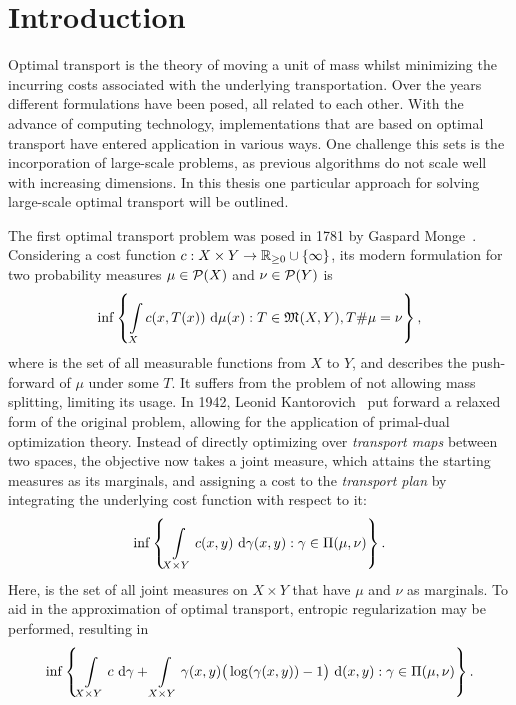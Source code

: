 \chapter*{Introduction}

Optimal transport is the theory of moving a unit of mass whilst minimizing the incurring costs associated with the underlying transportation. Over the years different formulations have been posed, all related to each other. With the advance of computing technology, implementations that are based on optimal transport have entered application in various ways. One challenge this sets is the incorporation of large-scale problems, as previous algorithms do not scale well with increasing dimensions. In this thesis one particular approach for solving large-scale optimal transport will be outlined.

The first optimal transport problem was posed in 1781 by Gaspard Monge\ \cite{Mon1781}. Considering a cost function $\map[c]{X \times Y}{\RZero \cup \{ \infty \}}$, its modern formulation for two probability measures $\mu \in \PM{X}$ and $\nu \in \PM{Y}$ is
\[ \inf \left\{ \int\limits_X c(x, T(x))~\Dx{\mu} : T \in \MF{X}{Y}, \push{\mu} = \nu \right\}, \]
where  is the set of all measurable functions from $X$ to $Y$, and \push{\mu} describes the push-forward of $\mu$ under some $T$.
It suffers from the problem of not allowing mass splitting, limiting its usage. In 1942, Leonid Kantorovich\ \cite{Kan1942} put forward a relaxed form of the original problem, allowing for the application of primal-dual optimization theory. Instead of directly optimizing over \textit{transport maps} between two spaces, the objective now takes a joint measure, which attains the starting measures as its marginals, and assigning a cost to the \textit{transport plan} by integrating the underlying cost function with respect to it:
\[ \inf \left\{ \int\limits_{X \times Y} c(x, y)~\Dx[x, y]{\gamma} : \gamma \in \TP{\mu}{\nu} \right\}. \]
Here, \TP{\mu}{\nu} is the set of all joint measures on $X \times Y$ that have $\mu$ and $\nu$ as marginals. To aid in the approximation of optimal transport, entropic regularization may be performed, resulting in
\[ \inf \left\{ \int\limits_{X \times Y} c~\D[\gamma] + \int\limits_{X \times Y} \gamma(x, y) \big( \log(\gamma(x, y)) - 1 \big)~\D[(x, y)] : \gamma \in \TP{\mu}{\nu} \right\}. \]

